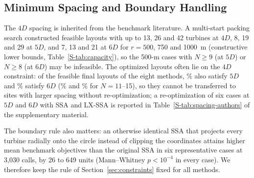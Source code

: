 \documentclass[journal,twoside]{IEEEtran}
\begin{document}
\subsection{Minimum Spacing and Boundary Handling}
\label{sec:spacing}
\label{sec:boundary}
The $4D$ spacing is inherited from the benchmark literature. A multi-start packing search constructed feasible layouts with up to 13, 26 and 42 turbines at $4D$, 8, 19 and 29 at $5D$, and 7, 13 and 21 at $6D$ for $r=500$, 750 and 1000~m (constructive lower bounds, Table~\ref{S-tab:capacity}), so the 500-m cases with $N\ge9$ (at $5D$) or $N\ge8$ (at $6D$) may be infeasible. The optimized layouts often lie on the $4D$ constraint: of the feasible final layouts of the eight methods, \NSpFiveAll\% also satisfy $5D$ and \NSpSixAll\% satisfy $6D$ (\NSpFiveLarge\% and \NSpSixLarge\% for $N=11$--15), so they cannot be transferred to sites with larger spacing without re-optimization; a re-optimization of six cases at $5D$ and $6D$ with SSA and LX-SSA is reported in Table~\ref{S-tab:spacing-authors} of the supplementary material.

The boundary rule also matters: an otherwise identical SSA that projects every turbine radially onto the circle instead of clipping the coordinates attains higher mean benchmark objectives than the original SSA in six representative cases at 3,030 calls, by 26 to 649 units (Mann--Whitney $p<10^{-4}$ in every case). We therefore keep the rule of Section~\ref{sec:constraints} fixed for all methods.
\end{document}
